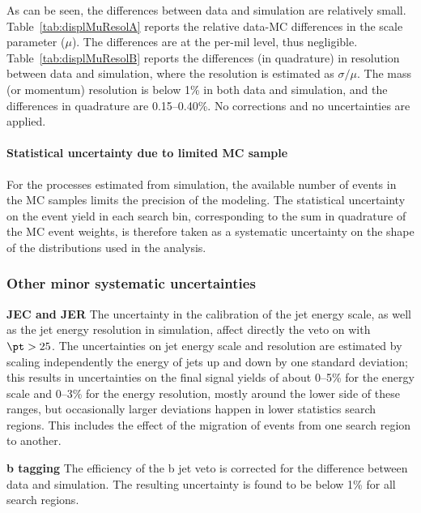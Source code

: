 As can be seen, the differences between data and simulation are
relatively small. Table~\ref{tab:displMuResolA} reports the relative
data-MC differences in the scale parameter ($\mu$). The differences are
at the per-mil level, thus negligible.
Table~\ref{tab:displMuResolB} reports the differences (in quadrature) in
resolution between data and simulation, where the resolution is
estimated as $\sigma/\mu$. The mass (or momentum) resolution is below
1\% in both data and simulation, and the differences in quadrature are
0.15--0.40\%. No corrections and no uncertainties are applied.

\paragraph{Statistical uncertainty due to limited MC sample}
For the processes estimated from simulation, the available number of
events in the MC samples limits the precision of the modeling.
The statistical uncertainty on the event yield in each search bin,
corresponding to the sum in quadrature of the MC event weights, is
therefore taken as a systematic uncertainty on the shape of the
distributions used in the analysis.



\subsubsection*{Other minor systematic uncertainties}
\textbf{JEC and JER}
The uncertainty in the calibration of the jet energy scale, as well
as the jet energy resolution in simulation, affect directly the veto
on \PQb with $\pt>25$\GeV.
The uncertainties on jet energy scale and resolution are estimated by
scaling independently the energy of jets up and down by one standard
deviation; this results in uncertainties on the final signal yields of about
0--5\% for the energy scale and 0--3\% for the energy resolution,
mostly around the lower side of these ranges, but occasionally larger
deviations happen in lower statistics search regions.
This includes the effect of the migration of events from one search
region to another.

\textbf{b tagging}
The efficiency of the b jet veto is corrected for the difference
between data and simulation.
The resulting uncertainty is found to
be below 1\% for all search regions.

